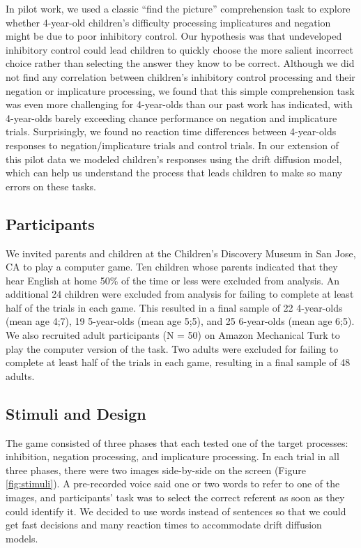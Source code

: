\documentclass[10pt,letterpaper]{article}
\begin{document}
In pilot work, we used a classic ``find the picture'' comprehension task to explore whether 4-year-old children's difficulty processing implicatures and negation might be due to poor inhibitory control.  Our hypothesis was that undeveloped inhibitory control could lead children to quickly choose the more salient incorrect choice rather than selecting the answer they know to be correct.  Although we did not find any correlation between children's inhibitory control processing and their negation or implicature processing, we found that this simple comprehension task was even more challenging for 4-year-olds than our past work has indicated, with 4-year-olds barely exceeding chance performance on negation and implicature trials.  Surprisingly, we found no reaction time differences between 4-year-olds responses to negation/implicature trials and control trials. In our extension of this pilot data we modeled children's responses using the drift diffusion model, which can help us understand the process that leads children to make so many errors on these tasks.  

\subsection{Participants}

We invited parents and children at the Children's Discovery Museum in San Jose, CA to play a computer game.  Ten children whose parents indicated that they hear English at home 50\% of the time or less were excluded from analysis.  An additional 24 children were excluded from analysis for failing to complete at least half of the trials in each game.  This resulted in a final sample of 22 4-year-olds (mean age 4;7), 19 5-year-olds (mean age 5;5), and 25 6-year-olds (mean age 6;5).  We also recruited adult participants (N = 50) on Amazon Mechanical Turk to play the computer version of the task.  Two adults were excluded for failing to complete at least half of the trials in each game, resulting in a final sample of 48 adults.  


\subsection{Stimuli and Design}

The game consisted of three phases that each tested one of the target processes: inhibition, negation processing, and implicature processing.  In each trial in all three phases, there were two images side-by-side on the screen (Figure \ref{fig:stimuli}). A pre-recorded voice said one or two words to refer to one of the images, and participants' task was to select the correct referent as soon as they could identify it. We decided to use words instead of sentences so that we could get fast decisions and many reaction times to accommodate drift diffusion models. 
\end{document}
